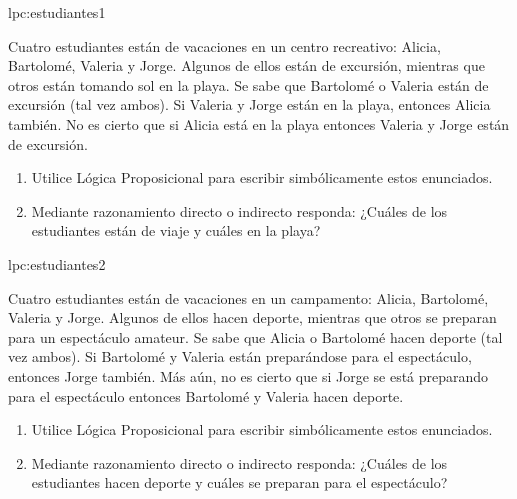 \begin{defproblem}{lpc:estudiantes1}%
 \begin{onlyproblem}%
 Cuatro estudiantes están de vacaciones en un centro recreativo: Alicia, Bartolomé, Valeria y Jorge. Algunos de ellos están de excursión, mientras que otros están tomando sol en la playa.
 Se sabe que Bartolomé o Valeria están de excursión (tal vez ambos).
 Si Valeria y Jorge están en la playa, entonces Alicia también.
 No es cierto que si Alicia está en la playa entonces Valeria y Jorge están de excursión.
 \begin{enumerate}
 	\item Utilice Lógica Proposicional para escribir simbólicamente estos enunciados.%
 	\item Mediante razonamiento directo o indirecto responda: ¿Cuáles de los estudiantes están de viaje y cuáles en la playa?%
 \end{enumerate}
 
 \end{onlyproblem}%
 \begin{onlysolution}%
 
 \end{onlysolution}%
\end{defproblem}

\begin{defproblem}{lpc:estudiantes2}%
	\begin{onlyproblem}%
		Cuatro estudiantes están de vacaciones en un campamento: Alicia, Bartolomé, Valeria y Jorge. Algunos de ellos hacen deporte, mientras que otros se preparan para un espectáculo amateur.
		Se sabe que Alicia o Bartolomé hacen deporte (tal vez ambos).
		Si Bartolomé y Valeria están preparándose para el espectáculo, entonces Jorge también.
		Más aún, no es cierto que si Jorge se está preparando para el espectáculo entonces Bartolomé y Valeria hacen deporte.
		
		\begin{enumerate}
			\item Utilice Lógica Proposicional para escribir simbólicamente estos enunciados.%
			\item Mediante razonamiento directo o indirecto responda: ¿Cuáles de los estudiantes hacen deporte y cuáles se preparan para el espectáculo?%
		\end{enumerate}
		
	\end{onlyproblem}%
	\begin{onlysolution}%
		
	\end{onlysolution}%
\end{defproblem}